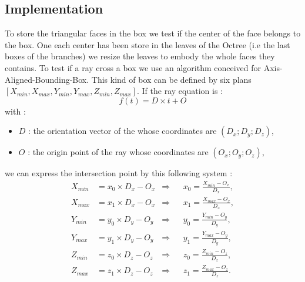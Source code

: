 \documentclass[AMA,STIX1COL]{WileyNJD-v2}
\begin{document}
\subsection{Implementation}


To store the triangular faces in the box we test if the center of the face belongs to the box. One each center has been store in the leaves of the Octree (i.e the last boxes of the branches) we resize the leaves to embody the whole faces they contains. To test if a ray cross a box we use an algorithm conceived for Axis-Aligned-Bounding-Box. This kind of box can be defined by six plans $\left[ X_{min}, X_{max}, Y_{min}, Y_{max}, Z_{min}, Z_{max} \right] $. If the ray equation is :
\begin{equation}
f(t) = D \times t + O
\end{equation}
with :
\begin{itemize}
\item $D$ : the orientation vector of the whose coordinates are $(D_x ; D_y ; D_z)$,
\item $O$ : the origin point of the ray whose coordinates are $(O_x ; O_y ; O_z)$,
\end{itemize}
we can express the intersection point by this following system :
\begin{align}
X_{min} &= x_0 \times D_x - O_x 	& \Rightarrow 	& &	 x_0 = \frac{X_{min} - O_x}{D_x}, \\
X_{max} &= x_1 \times D_x - O_x 	& \Rightarrow 	& &	x_1 = \frac{X_{max} - O_x}{D_x}, \\
Y_{min} &= y_0 \times D_y - O_y 	& \Rightarrow	& &	y_0 = \frac{Y_{min} - O_y}{D_y}, \\
Y_{max} &= y_1 \times D_y - O_y 	& \Rightarrow	& &	y_1 = \frac{Y_{max} - O_y}{D_y}, \\
Z_{min} &= z_0 \times D_z - O_z	& \Rightarrow 	& &	z_0 = \frac{Z_{min} - O_z}{D_z}, \\
Z_{max} &= z_1 \times D_z - O_z 	& \Rightarrow 	& &	z_1 = \frac{Z_{max} - O_z}{D_z}. 
\end{align}
%
\end{document}
